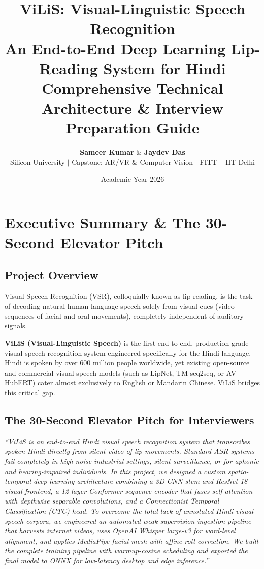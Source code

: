 \documentclass[11pt,a4paper]{article}
\title{\textbf{\Huge ViLiS: Visual-Linguistic Speech Recognition}\\[0.5em]
\Large An End-to-End Deep Learning Lip-Reading System for Hindi\\[0.8em]
\normalsize \textbf{Comprehensive Technical Architecture \& Interview Preparation Guide}}
\author{\textbf{Sameer Kumar} \& \textbf{Jaydev Das}\\
Silicon University $\vert$ Capstone: AR/VR \& Computer Vision $\vert$ FITT -- IIT Delhi}
\date{Academic Year 2026}
\begin{document}
\maketitle
\tableofcontents
\newpage

\section{Executive Summary \& The 30-Second Elevator Pitch}
\subsection{Project Overview}
Visual Speech Recognition (VSR), colloquially known as lip-reading, is the task of decoding natural human language speech solely from visual cues (video sequences of facial and oral movements), completely independent of auditory signals.

\textbf{ViLiS (Visual-Linguistic Speech)} is the first end-to-end, production-grade visual speech recognition system engineered specifically for the Hindi language. Hindi is spoken by over 600 million people worldwide, yet existing open-source and commercial visual speech models (such as LipNet, TM-seq2seq, or AV-HubERT) cater almost exclusively to English or Mandarin Chinese. ViLiS bridges this critical gap.

\subsection{The 30-Second Elevator Pitch for Interviewers}
\begin{tcolorbox}[colback=blue!5!white,colframe=blue!75!black,title=\textbf{How to Pitch ViLiS in an Interview}]
\textit{``ViLiS is an end-to-end Hindi visual speech recognition system that transcribes spoken Hindi directly from silent video of lip movements. Standard ASR systems fail completely in high-noise industrial settings, silent surveillance, or for aphonic and hearing-impaired individuals. In this project, we designed a custom spatio-temporal deep learning architecture combining a 3D-CNN stem and ResNet-18 visual frontend, a 12-layer Conformer sequence encoder that fuses self-attention with depthwise separable convolutions, and a Connectionist Temporal Classification (CTC) head. To overcome the total lack of annotated Hindi visual speech corpora, we engineered an automated weak-supervision ingestion pipeline that harvests internet videos, uses OpenAI Whisper large-v3 for word-level alignment, and applies MediaPipe facial mesh with affine roll correction. We built the complete training pipeline with warmup-cosine scheduling and exported the final model to ONNX for low-latency desktop and edge inference.''}
\end{tcolorbox}
\end{document}
